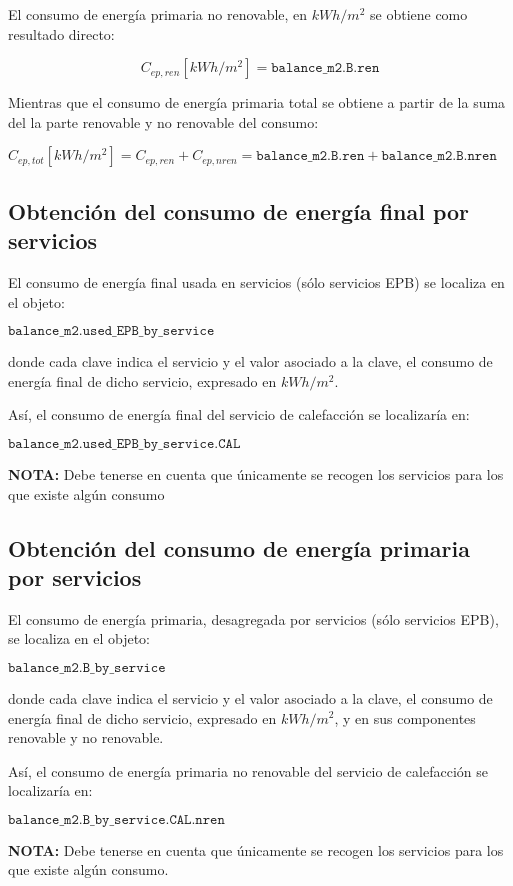 \documentclass[10pt,notitlepage,oneside,a4paper]{article}
\begin{document}
El consumo de energía primaria no renovable, en $kWh/m^2$ se obtiene como resultado directo:

$$C_{ep,ren} [kWh/m^2] = \texttt{balance\_m2.B.ren}$$

Mientras que el consumo de energía primaria total se obtiene a partir de la suma del la parte renovable y no renovable del consumo:

$C_{ep,tot} [kWh/m^2] = C_{ep,ren} + C_{ep,nren} = \texttt{balance\_m2.B.ren} + \texttt{balance\_m2.B.nren}$

\subsection{Obtención del consumo de energía final por servicios}

El consumo de energía final usada en servicios (sólo servicios EPB) se localiza en el objeto:

$\texttt{balance\_m2.used\_EPB\_by\_service}$

donde cada clave indica el servicio y el valor asociado a la clave, el consumo de energía final de dicho servicio, expresado en $kWh/m^2$.

Así, el consumo de energía final del servicio de calefacción se localizaría en:

$\texttt{balance\_m2.used\_EPB\_by\_service.CAL}$

\textbf{NOTA:} Debe tenerse en cuenta que únicamente se recogen los servicios para los que existe algún consumo

\subsection{Obtención del consumo de energía primaria por servicios}

El consumo de energía primaria, desagregada por servicios (sólo servicios EPB), se localiza en el objeto:

$\texttt{balance\_m2.B\_by\_service}$

donde cada clave indica el servicio y el valor asociado a la clave, el consumo de energía final de dicho servicio, expresado en $kWh/m^2$, y en sus componentes renovable y no renovable.

Así, el consumo de energía primaria no renovable del servicio de calefacción se localizaría en:

$\texttt{balance\_m2.B\_by\_service.CAL.nren}$

\textbf{NOTA:} Debe tenerse en cuenta que únicamente se recogen los servicios para los que existe algún consumo.
\end{document}
